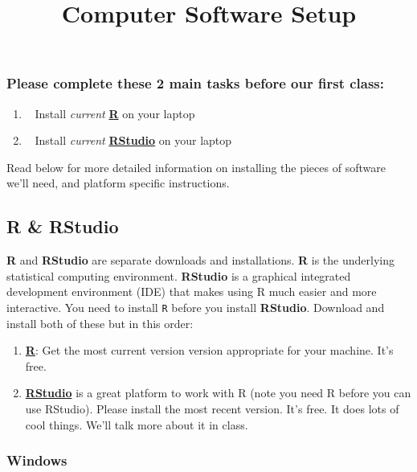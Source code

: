 \documentclass[
]{article}
\title{Computer Software Setup}
\author{}
\date{\vspace{-2.5em}}
\begin{document}
\maketitle

\subsubsection{Please complete these 2 main tasks before our first
class:}\label{please-complete-these-2-main-tasks-before-our-first-class}

\begin{enumerate}
\def\labelenumi{\arabic{enumi}.}
\item
  ~ Install \emph{current} \href{https://cran.rstudio.com/}{\textbf{R}}
  on your laptop
\item
  ~ Install \emph{current}
  \href{https://www.rstudio.com/products/rstudio/download/}{\textbf{RStudio}}
  on your laptop
\end{enumerate}

Read below for more detailed information on installing the pieces of
software we'll need, and platform specific instructions.

\subsection{R \& RStudio}\label{r-rstudio}

\textbf{R} and \textbf{RStudio} are separate downloads and
installations. \textbf{R} is the underlying statistical computing
environment. \textbf{RStudio} is a graphical integrated development
environment (IDE) that makes using R much easier and more interactive.
You need to install \texttt{R} before you install \textbf{RStudio}.
Download and install both of these but in this order:

\begin{enumerate}
\def\labelenumi{\arabic{enumi}.}
\item
  \href{http://cran.rstudio.com/}{\textbf{R}}: Get the most current
  version version appropriate for your machine. It's free.
\item
  \href{http://www.rstudio.com/products/rstudio/download/}{\textbf{RStudio}}
  is a great platform to work with R (note you need R before you can use
  RStudio). Please install the most recent version. It's free. It does
  lots of cool things. We'll talk more about it in class.
\end{enumerate}

\subsubsection{Windows}\label{windows}
\end{document}
